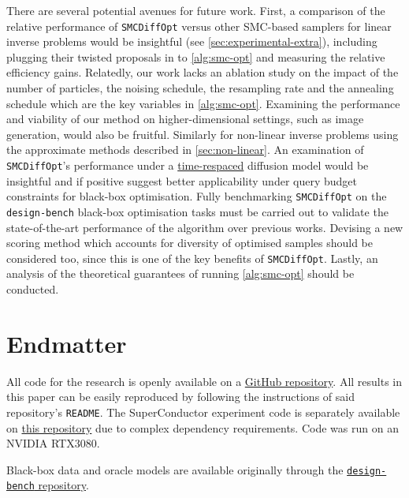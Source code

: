 There are several potential avenues for future work. First, a comparison of the relative performance
of \texttt{SMCDiffOpt} versus other SMC-based samplers
\parencite{cardosoMonteCarloGuided2023,douDiffusionPosteriorSampling2023,wuPracticalAsymptoticallyExact2023}
for linear inverse problems would be insightful (see \autoref{sec:experimental-extra}), including
plugging their twisted proposals in to \autoref{alg:smc-opt} and measuring the relative efficiency
gains. Relatedly, our work lacks an ablation study on the impact of the number of particles, the
noising schedule, the resampling rate and the annealing schedule which are the key variables in
\autoref{alg:smc-opt}. Examining the performance and viability of our method on higher-dimensional
settings, such as image generation, would also be fruitful. Similarly for non-linear inverse
problems using the approximate methods described in \autoref{sec:non-linear}. An examination
of \texttt{SMCDiffOpt}'s performance under a \hyperref[rem:time-respacing]{time-respaced} diffusion
model would be insightful and if positive suggest better applicability under query budget
constraints for black-box optimisation. Fully benchmarking \texttt{SMCDiffOpt} on the
\texttt{design-bench} black-box optimisation tasks must be carried out to validate the
state-of-the-art performance of the algorithm over previous works. Devising a new scoring method
which accounts for diversity of optimised samples should be considered too, since this is one of the
key benefits of \texttt{SMCDiffOpt}. Lastly, an analysis of the theoretical guarantees of running
\autoref{alg:smc-opt} should be conducted.

\section*{Endmatter}

All code for the research is openly available on a
\href{https://github.com/bd3dowling/diffusion-research}{GitHub repository}.
All results in this paper can be easily reproduced by following the instructions of said
repository's \texttt{README}. The SuperConductor experiment code is separately available on
\href{https://github.com/bd3dowling/superconductor}{this repository} due to complex dependency
requirements. Code was run on an NVIDIA RTX3080.

Black-box data and oracle models are available originally through the
\href{https://github.com/brandontrabucco/design-bench}{\texttt{design-bench} repository}.
